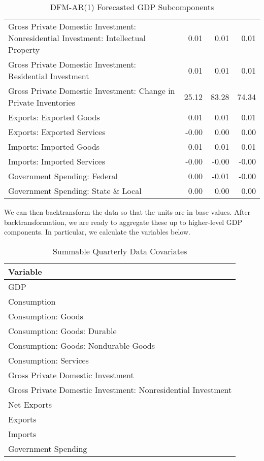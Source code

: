 \documentclass[11pt, letterpaper]{article}\usepackage[]{graphicx}\usepackage[]{color}
\begin{document}
\begin{table}[H]
\begin{tabular}{lrrr}
  Gross Private Domestic Investment: Nonresidential Investment: Intellectual Property & 0.01 & 0.01 & 0.01 \\ 
  Gross Private Domestic Investment: Residential Investment & 0.01 & 0.01 & 0.01 \\ 
  Gross Private Domestic Investment: Change in Private Inventories & 25.12 & 83.28 & 74.34 \\ 
  Exports: Exported Goods & 0.01 & 0.01 & 0.01 \\ 
  Exports: Exported Services & -0.00 & 0.00 & 0.00 \\ 
  Imports: Imported Goods & 0.01 & 0.01 & 0.01 \\ 
  Imports: Imported Services & -0.00 & -0.00 & -0.00 \\ 
  Government Spending: Federal & 0.00 & -0.01 & -0.00 \\ 
  Government Spending: State \& Local & 0.00 & 0.00 & 0.00 \\ 
   \hline
\end{tabular}
\endgroup
\caption{DFM-AR(1) Forecasted GDP Subcomponents} 
\end{table}


We can then backtransform the data so that the units are in base values. After backtransformation, we are ready to aggregate these up to higher-level GDP components. In particular, we calculate the variables below.
\begin{table}[H]
\centering
\begingroup\scriptsize
\begin{tabular}{l}
  \hline
Variable \\ 
  \hline
GDP \\ 
  Consumption \\ 
  Consumption: Goods \\ 
  Consumption: Goods: Durable \\ 
  Consumption: Goods: Nondurable Goods \\ 
  Consumption: Services \\ 
  Gross Private Domestic Investment \\ 
  Gross Private Domestic Investment: Nonresidential Investment \\ 
  Net Exports \\ 
  Exports \\ 
  Imports \\ 
  Government Spending \\ 
   \hline
\end{tabular}
\endgroup
\caption{Summable Quarterly Data Covariates} 
\end{table}
\end{document}
